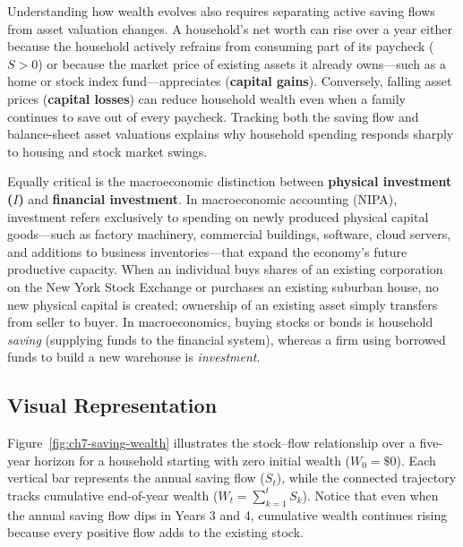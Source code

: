 \documentclass[11pt,letterpaper]{article}
\begin{document}
Understanding how wealth evolves also requires separating active saving flows from asset valuation changes. A household's net worth can rise over a year either because the household actively refrains from consuming part of its paycheck ($S > 0$) or because the market price of existing assets it already owns—such as a home or stock index fund—appreciates (\textbf{capital gains}). Conversely, falling asset prices (\textbf{capital losses}) can reduce household wealth even when a family continues to save out of every paycheck. Tracking both the saving flow and balance-sheet asset valuations explains why household spending responds sharply to housing and stock market swings.

Equally critical is the macroeconomic distinction between \textbf{physical investment ($I$)} and \textbf{financial investment}. In macroeconomic accounting (NIPA), investment refers exclusively to spending on newly produced physical capital goods—such as factory machinery, commercial buildings, software, cloud servers, and additions to business inventories—that expand the economy's future productive capacity. When an individual buys shares of an existing corporation on the New York Stock Exchange or purchases an existing suburban house, no new physical capital is created; ownership of an existing asset simply transfers from seller to buyer. In macroeconomics, buying stocks or bonds is household \emph{saving} (supplying funds to the financial system), whereas a firm using borrowed funds to build a new warehouse is \emph{investment}.

\subsection*{Visual Representation}
Figure~\ref{fig:ch7-saving-wealth} illustrates the stock--flow relationship over a five-year horizon for a household starting with zero initial wealth ($W_0 = \$0$). Each vertical bar represents the annual saving flow ($S_t$), while the connected trajectory tracks cumulative end-of-year wealth ($W_t = \sum_{k=1}^{t} S_k$). Notice that even when the annual saving flow dips in Years 3 and 4, cumulative wealth continues rising because every positive flow adds to the existing stock.
\end{document}
